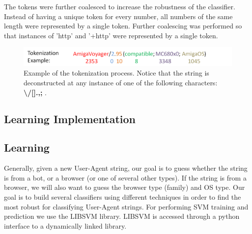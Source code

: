 \documentclass[10pt]{article}
\begin{document}
The tokens were further coalesced to increase the robustness of the classifier.  Instead of having a unique token for every number, all numbers of the same length were represented by a single token.  Further coalescing was performed so that instances of 'http' and '+http' were represented by a single token.      

\begin{figure}
\includegraphics[width=6in]{token_figure.png}
\caption{Example of the tokenization process.  Notice that the string is deconstructed at any instance of one of the following characters: {\bf \textbackslash /[].,;}  .}
\end{figure}


\subsection{Learning Implementation}
\subsection{Learning}
Generally, given a new User-Agent string, our goal is to guess whether the string is from a bot, or a browser (or one of several other types).  If the string is from a browser, we will also want to guess the browser type (family) and OS type.    Our goal is to build several classifiers using different techniques in order to find the most robust for classifying User-Agent strings.  For performing SVM training and prediction we use the LIBSVM library.\cite{libsvm}  LIBSVM is accessed through a python interface to a dynamically linked library. 
\end{document}
